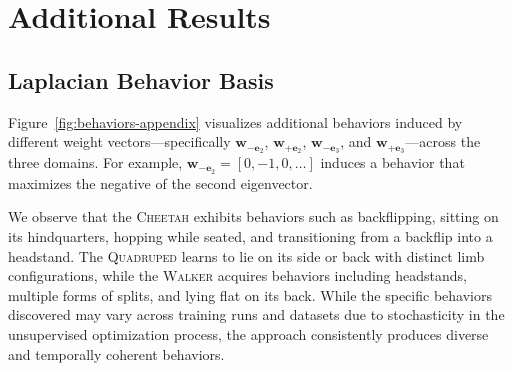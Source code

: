 \documentclass{article}
\theoremstyle{plain}
\theoremstyle{definition}
\theoremstyle{remark}
\begin{document}
\section{Additional Results}

\subsection{Laplacian Behavior Basis}


Figure~\ref{fig:behaviors-appendix} visualizes additional behaviors induced by different weight vectors---specifically $\mathbf{w}_{-\mathbf{e}_2}$, $\mathbf{w}_{+\mathbf{e}_2}$, $\mathbf{w}_{-\mathbf{e}_3}$, and $\mathbf{w}_{+\mathbf{e}_3}$---across the three domains. For example, $\mathbf{w}_{-\mathbf{e}_2} = [0, -1, 0, \dots]$ induces a behavior that maximizes the negative of the second eigenvector.

We observe that the \textsc{Cheetah} exhibits behaviors such as backflipping, sitting on its hindquarters, hopping while seated, and transitioning from a backflip into a headstand. The \textsc{Quadruped} learns to lie on its side or back with distinct limb configurations, while the \textsc{Walker} acquires behaviors including headstands, multiple forms of splits, and lying flat on its back. While the specific behaviors discovered may vary across training runs and datasets due to stochasticity in the unsupervised optimization process, the approach consistently produces diverse and temporally coherent behaviors.
\end{document}
